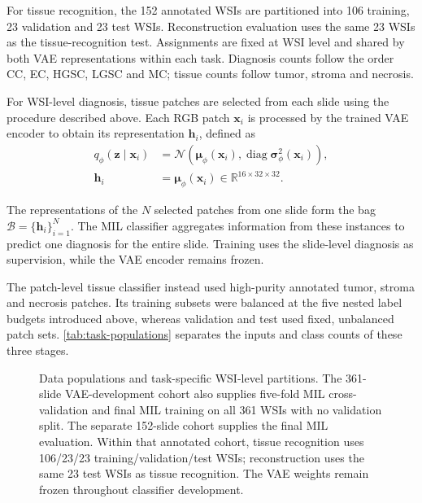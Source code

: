 \documentclass{midl}
\begin{document}
For tissue recognition, the 152 annotated WSIs are partitioned into 106 training, 23 validation and 23 test WSIs. Reconstruction evaluation uses the same 23 WSIs as the tissue-recognition test. Assignments are fixed at WSI level and shared by both VAE representations within each task. Diagnosis counts follow the order CC, EC, HGSC, LGSC and MC; tissue counts follow tumor, stroma and necrosis.

For WSI-level diagnosis, tissue patches are selected from each slide using the procedure described above. Each RGB patch $\mathbf{x}_i$ is processed by the trained VAE encoder to obtain its representation $\mathbf{h}_i$, defined as
\begin{equation}
\begin{aligned}
q_\phi(\mathbf{z}\mid\mathbf{x}_i)
&=\mathcal{N}\!\left(
\boldsymbol{\mu}_\phi(\mathbf{x}_i),
\operatorname{diag}\boldsymbol{\sigma}_\phi^2(\mathbf{x}_i)
\right),\\
\mathbf{h}_i
&=\boldsymbol{\mu}_\phi(\mathbf{x}_i)
\in\mathbb{R}^{16\times32\times32}.
\end{aligned}
\label{eq:mil-patch-representation}
\end{equation}

The representations of the $N$ selected patches from one slide form the bag $\mathcal{B}=\{\mathbf{h}_i\}_{i=1}^{N}$. The MIL classifier aggregates information from these instances to predict one diagnosis for the entire slide. Training uses the slide-level diagnosis as supervision, while the VAE encoder remains frozen.

The patch-level tissue classifier instead used high-purity annotated tumor, stroma and necrosis patches. Its training subsets were balanced at the five nested label budgets introduced above, whereas validation and test used fixed, unbalanced patch sets. \autoref{tab:task-populations} separates the inputs and class counts of these three stages.

\begin{figure}[p]
\centering
\resizebox{0.98\textwidth}{!}{}
\caption{Data populations and task-specific WSI-level partitions. The 361-slide VAE-development cohort also supplies five-fold MIL cross-validation and final MIL training on all 361 WSIs with no validation split. The separate 152-slide cohort supplies the final MIL evaluation. Within that annotated cohort, tissue recognition uses 106/23/23 training/validation/test WSIs; reconstruction uses the same 23 test WSIs as tissue recognition. The VAE weights remain frozen throughout classifier development.}
\label{fig:data-split}
\end{figure}
\end{document}
